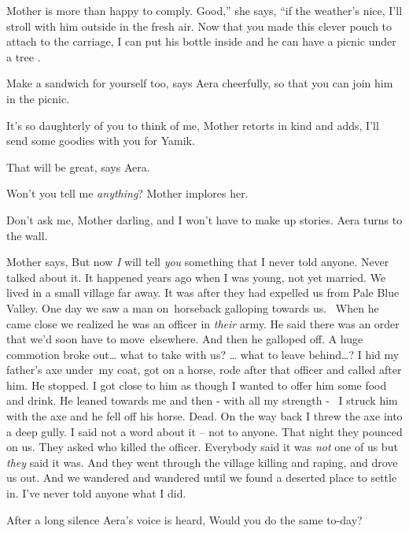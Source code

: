 \documentclass[letterpaper]{article}
\begin{document}
Mother is more than happy to comply. {\textquotedbl}Good,'' she says, ``if the weather's nice, I'll stroll with him
outside in the fresh air. Now that you made this clever pouch to attach to the carriage, I can put his bottle inside
and he can have a picnic under a tree .{\textquotedbl}

{\textquotedbl}Make a sandwich for yourself too,{\textquotedbl} says Aera cheerfully, {\textquotedbl}so that you can
join him in the picnic.{\textquotedbl} 

{\textquotedbl}It's so daughterly of you to think of me,{\textquotedbl} Mother retorts in kind and adds,
{\textquotedbl}I'll send some goodies with you for Yamik.{\textquotedbl}

{\textquotedbl}That will be great,{\textquotedbl} says Aera.

{\textquotedbl}Won't you tell me \textit{anything}?{\textquotedbl} Mother implores her. 

{\textquotedbl}Don't ask me, Mother darling, and I won't have to make up stories.{\textquotedbl} Aera turns to the wall.

Mother says, {\textquotedbl}But now \textit{I }will tell \textit{you} something that I never told anyone. Never talked
about it. It happened years ago when I was young, not yet married. We lived in a small village far away. It was after
they had expelled us from Pale Blue Valley. One day we saw a man on~horseback galloping towards us. ~When he came close
we realized he was an officer in \textit{their} army. He said there was an order that we'd soon have to move~elsewhere.
And then he galloped off. A huge commotion broke out{\dots} what to take with us? {\dots} what to leave behind{\dots}?
I hid my father's axe under~my coat, got on a horse, rode after that officer and called after him. He stopped. I got
close to him as though I wanted to offer him some food and drink. He leaned towards me and then - with all my strength
- \ I struck him with the axe and he fell off his horse. Dead. On the way back I threw the axe into a deep gully. I
said not a word about it -- not to anyone. That night they pounced on us. They asked who killed the officer. Everybody
said it was \textit{not} one of us but \textit{they} said it was. And they went through the village killing and raping,
and drove us out. And we wandered and wandered until we found a deserted place to settle in. I've never told anyone
what I did.{\textquotedbl}

After a long silence Aera's voice is heard, {\textquotedbl}Would you do the same to-day?{\textquotedbl} 
\end{document}

